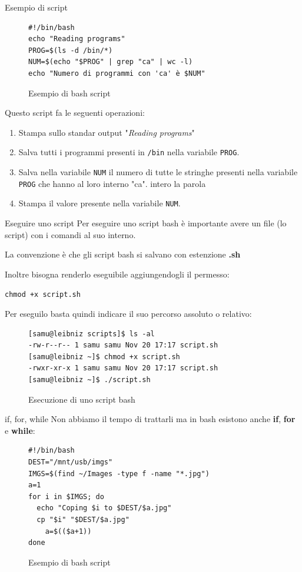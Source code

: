 \documentclass{beamer}
\begin{document}
\begin{frame}[fragile]{Esempio di script}
  \begin{figure}
    \begin{lstlisting}
#!/bin/bash
echo "Reading programs"
PROG=$(ls -d /bin/*)
NUM=$(echo "$PROG" | grep "ca" | wc -l)
echo "Numero di programmi con 'ca' è $NUM"
    \end{lstlisting}
    \caption{Esempio di bash script}
  \end{figure}

  Questo script fa le seguenti operazioni:
  \begin{enumerate}
    \item Stampa sullo standar output "\textit{Reading programs}"
    \item Salva tutti i programmi presenti in \texttt{/bin} nella variabile 
      \texttt{PROG}.
    \item Salva nella variabile \texttt{NUM} il numero di tutte le stringhe 
      presenti nella variabile \texttt{PROG} che hanno al loro interno "ca".
      intero la parola 
    \item Stampa il valore presente nella variabile \texttt{NUM}.
  \end{enumerate}
\end{frame}

\begin{frame}[fragile]{Eseguire uno script}
  Per eseguire uno script bash è importante avere un file (lo script) con i 
  comandi al suo interno. \medskip

  La convenzione è che gli script bash si salvano con estenzione \textbf{.sh}
  \medskip

  Inoltre bisogna renderlo eseguibile aggiungendogli il permesso: \smallskip

  \texttt{chmod +x script.sh} \medskip

  Per eseguilo basta quindi indicare il suo percorso assoluto o relativo:
  \begin{figure}
    \begin{lstlisting}
[samu@leibniz scripts]$ ls -al
-rw-r--r-- 1 samu samu Nov 20 17:17 script.sh
[samu@leibniz ~]$ chmod +x script.sh
-rwxr-xr-x 1 samu samu Nov 20 17:17 script.sh
[samu@leibniz ~]$ ./script.sh
    \end{lstlisting}
    \caption{Esecuzione di uno script bash}
  \end{figure}
\end{frame}

\begin{frame}[fragile]{if, for, while}
  Non abbiamo il tempo di trattarli ma in bash esistono anche \textbf{if}, 
  \textbf{for} e \textbf{while}:
  \begin{figure}
    \begin{lstlisting}
#!/bin/bash
DEST="/mnt/usb/imgs"
IMGS=$(find ~/Images -type f -name "*.jpg")
a=1
for i in $IMGS; do
  echo "Coping $i to $DEST/$a.jpg"
  cp "$i" "$DEST/$a.jpg"
    a=$(($a+1))
done
    \end{lstlisting}
    \caption{Esempio di bash script}
  \end{figure}
\end{frame}
\end{document}
